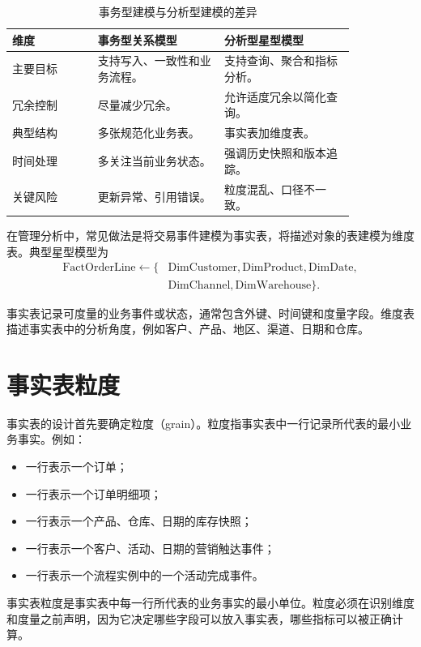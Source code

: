 \documentclass[UTF8,fontset=fandol,openany,zihao=-4]{ctexbook}
\begin{document}
\begin{table}[htbp]
\centering
\caption{事务型建模与分析型建模的差异}
\begin{tabular}{p{0.21\linewidth}p{0.31\linewidth}p{0.32\linewidth}}
\toprule
维度 & 事务型关系模型 & 分析型星型模型\\
\midrule
主要目标 & 支持写入、一致性和业务流程。 & 支持查询、聚合和指标分析。\\
冗余控制 & 尽量减少冗余。 & 允许适度冗余以简化查询。\\
典型结构 & 多张规范化业务表。 & 事实表加维度表。\\
时间处理 & 多关注当前业务状态。 & 强调历史快照和版本追踪。\\
关键风险 & 更新异常、引用错误。 & 粒度混乱、口径不一致。\\
\bottomrule
\end{tabular}
\end{table}

在管理分析中，常见做法是将交易事件建模为事实表，将描述对象的表建模为维度表。典型星型模型为
\[
\begin{aligned}
\text{FactOrderLine}\leftarrow
\{&\text{DimCustomer},\text{DimProduct},\text{DimDate},\\
&\text{DimChannel},\text{DimWarehouse}\}.
\end{aligned}
\]

\begin{definition}[事实表与维度表]
事实表记录可度量的业务事件或状态，通常包含外键、时间键和度量字段。维度表描述事实表中的分析角度，例如客户、产品、地区、渠道、日期和仓库。
\end{definition}

\section{事实表粒度}

事实表的设计首先要确定粒度（grain）。粒度指事实表中一行记录所代表的最小业务事实。例如：
\begin{itemize}
  \item 一行表示一个订单；
  \item 一行表示一个订单明细项；
  \item 一行表示一个产品、仓库、日期的库存快照；
  \item 一行表示一个客户、活动、日期的营销触达事件；
  \item 一行表示一个流程实例中的一个活动完成事件。
\end{itemize}

\begin{definition}[事实表粒度]
事实表粒度是事实表中每一行所代表的业务事实的最小单位。粒度必须在识别维度和度量之前声明，因为它决定哪些字段可以放入事实表，哪些指标可以被正确计算。
\end{definition}
\end{document}
